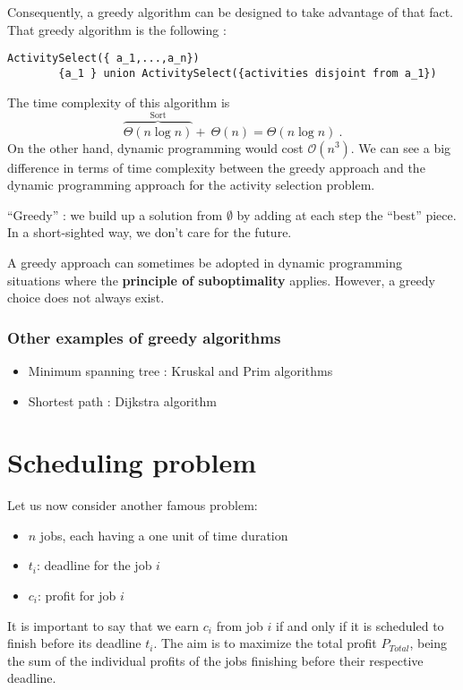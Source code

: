 Consequently, a greedy algorithm can be designed to take advantage of that fact. That greedy algorithm is the following :
\begin{lstlisting}[label={list:c6:activitySelectionGreedy},caption=Pseudo-code of the greedy algorithm for activity selection problem]
ActivitySelect({ a_1,...,a_n})
		{a_1 } union ActivitySelect({activities disjoint from a_1})
\end{lstlisting}
The time complexity of this algorithm is 
\begin{equation*}
\overbrace{\Theta(n \log n)}^{\text{Sort}} + \: \Theta(n) = \Theta(n \log n) \: .
\end{equation*}
On the other hand, dynamic programming would cost $\mathcal{O}(n^3)$. We can see a big difference in terms of time complexity between the greedy approach and the dynamic programming approach for the activity selection problem.

“Greedy” : we build up a solution from $\emptyset$ by adding at each step the “best” piece. In a short-sighted way, we don’t care for the future.

A greedy approach can sometimes be adopted in dynamic programming situations where the \textbf{principle of suboptimality} applies. However, a greedy choice does not always exist. 

\subsubsection{Other examples of greedy algorithms}
\begin{itemize}
 \item Minimum spanning tree : Kruskal and Prim algorithms
 \item Shortest path : Dijkstra algorithm
\end{itemize}

\section{Scheduling problem}
Let us now consider another famous problem:
\begin{itemize}
 \item $n$ jobs, each having a one unit of time duration
 \item $t_i$: deadline for the job $i$
 \item $c_i$: profit for job $i$
\end{itemize}

It is important to say that we earn $c_i$ from job $i$ if and only if it is scheduled to finish before its deadline $t_i$. The aim is to maximize the total profit $P_{Total}$, being the sum of the individual profits of the jobs finishing before their respective deadline.

